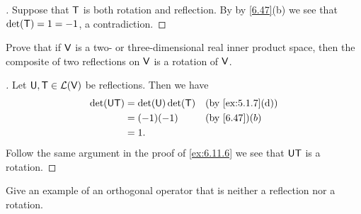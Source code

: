 \begin{proof}[]
  Suppose that \(\mathsf{T}\) is both rotation and reflection.
  By by \cref{6.47}(b) we see that \(\det(\mathsf{T}) = 1 = -1\), a contradiction.
\end{proof}

\begin{ex}\label{ex:6.11.10}
  Prove that if \(\mathsf{V}\) is a two- or three-dimensional real inner product space, then the composite of two reflections on \(\mathsf{V}\) is a rotation of \(\mathsf{V}\).
\end{ex}

\begin{proof}[]
  Let \(\mathsf{U}, \mathsf{T} \in \mathcal{L}(\mathsf{V})\) be reflections.
  Then we have
  \begin{align*}
    \det(\U \T) & = \det(\U) \det(\T) &  & \by{ex:5.1.7}[d] \\
                & = (-1) (-1)         &  & \by{6.47}(b)     \\
                & = 1.
  \end{align*}
  Follow the same argument in the proof of \cref{ex:6.11.6} we see that \(\mathsf{U} \mathsf{T}\) is a rotation.
\end{proof}

\begin{ex}\label{ex:6.11.11}
  Give an example of an orthogonal operator that is neither a reflection nor a rotation.
\end{ex}

